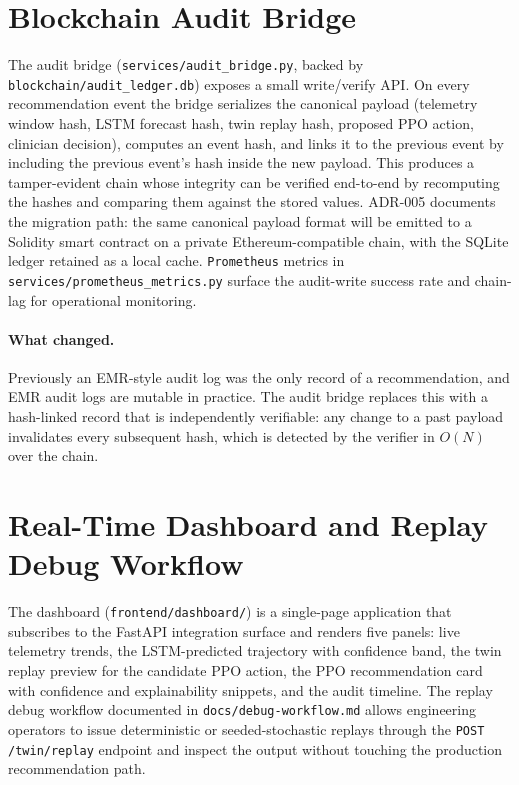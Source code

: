 \documentclass[12pt,a4paper,oneside]{report}
\begin{document}
\section{Blockchain Audit Bridge}
The audit bridge (\texttt{services/audit\_bridge.py}, backed by \texttt{blockchain/audit\_ledger.db}) exposes a small write/verify API. On every recommendation event the bridge serializes the canonical payload (telemetry window hash, LSTM forecast hash, twin replay hash, proposed PPO action, clinician decision), computes an event hash, and links it to the previous event by including the previous event's hash inside the new payload. This produces a tamper-evident chain whose integrity can be verified end-to-end by recomputing the hashes and comparing them against the stored values. ADR-005 documents the migration path: the same canonical payload format will be emitted to a Solidity smart contract on a private Ethereum-compatible chain, with the SQLite ledger retained as a local cache. \texttt{Prometheus} metrics in \texttt{services/prometheus\_metrics.py} surface the audit-write success rate and chain-lag for operational monitoring.

\paragraph{What changed.} Previously an EMR-style audit log was the only record of a recommendation, and EMR audit logs are mutable in practice. The audit bridge replaces this with a hash-linked record that is independently verifiable: any change to a past payload invalidates every subsequent hash, which is detected by the verifier in $O(N)$ over the chain.

\section{Real-Time Dashboard and Replay Debug Workflow}
The dashboard (\texttt{frontend/dashboard/}) is a single-page application that subscribes to the FastAPI integration surface and renders five panels: live telemetry trends, the LSTM-predicted trajectory with confidence band, the twin replay preview for the candidate PPO action, the PPO recommendation card with confidence and explainability snippets, and the audit timeline. The replay debug workflow documented in \texttt{docs/debug-workflow.md} allows engineering operators to issue deterministic or seeded-stochastic replays through the \texttt{POST /twin/replay} endpoint and inspect the output without touching the production recommendation path.
\end{document}
